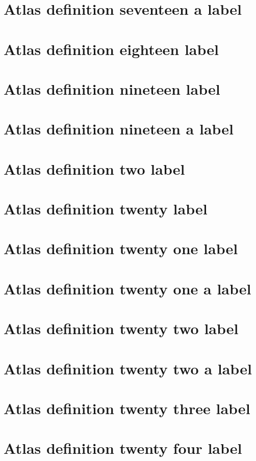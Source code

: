 \documentclass[11pt]{article}
\theoremstyle{definition}
\begin{document}
\section{Atlas definition seventeen a label}
\label{ll:labels:atlas-d17a}
\section{Atlas definition eighteen label}
\label{ll:labels:atlas-d18}
\section{Atlas definition nineteen label}
\label{ll:labels:atlas-d19}
\section{Atlas definition nineteen a label}
\label{ll:labels:atlas-d19a}
\section{Atlas definition two label}
\label{ll:labels:atlas-d2}
\section{Atlas definition twenty label}
\label{ll:labels:atlas-d20}
\section{Atlas definition twenty one label}
\label{ll:labels:atlas-d21}
\section{Atlas definition twenty one a label}
\label{ll:labels:atlas-d21a}
\section{Atlas definition twenty two label}
\label{ll:labels:atlas-d22}
\section{Atlas definition twenty two a label}
\label{ll:labels:atlas-d22a}
\section{Atlas definition twenty three label}
\label{ll:labels:atlas-d23}
\section{Atlas definition twenty four label}
\label{ll:labels:atlas-d24}
\end{document}
